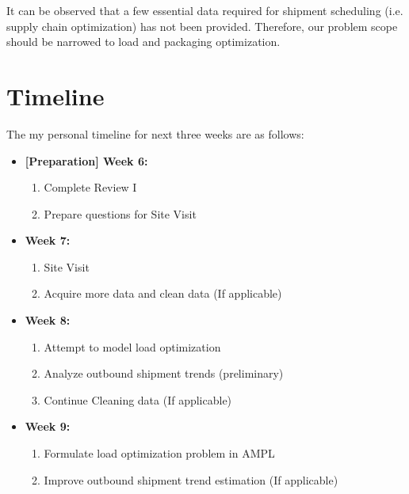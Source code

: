 \documentclass[a4paper, fleqn]{article}
\begin{document}
It can be observed that a few essential data required for shipment scheduling (i.e. supply chain optimization) has not been provided. Therefore, our problem scope should be narrowed to load and packaging optimization.
\section{Timeline}

The my personal timeline for next three weeks are as follows:
\begin{itemize}
\item \textbf{[Preparation] Week 6:}    \begin{enumerate}
\item Complete Review I
\item Prepare questions for Site Visit
\end{enumerate}
\item \textbf{Week 7:}    \begin{enumerate}
\item Site Visit
\item Acquire more data and clean data (If applicable)
\end{enumerate}
\item \textbf{Week 8:}     \begin{enumerate}
\item Attempt to model load optimization
\item Analyze outbound shipment trends (preliminary)
\item Continue Cleaning data (If applicable)
\end{enumerate}
\item \textbf{Week 9:}    \begin{enumerate}
\item Formulate load optimization problem in AMPL
\item Improve outbound shipment trend estimation (If applicable)
\end{enumerate}
\end{itemize}
\end{document}

